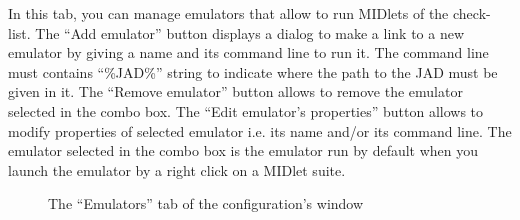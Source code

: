 \begin{itemize}
\begin{itemize}
		In this tab, you can manage emulators that allow to run MIDlets of the
		check-list. The ``Add emulator'' button displays a dialog to make a link to a
		new emulator by giving a name and its command line to run it. The
		command line must contains ``\%JAD\%'' string to indicate where the path to
		the JAD must be given in it.
		The ``Remove emulator'' button allows to remove the emulator selected in the
		combo box.		
		The ``Edit emulator's properties'' button allows to modify properties of
		selected emulator i.e. its name and/or its command line.		
		The emulator selected in the combo box is the emulator run by default when you
		launch the emulator by a right click on a MIDlet suite.
		
		\begin{figure}[ht]
			\begin{center}
			\end{center}
			\caption{The ``Emulators'' tab of the configuration's window}
			\label{EmulatorTabOfConfigDialog}
	   	\end{figure}
\end{itemize}
\end{itemize}

